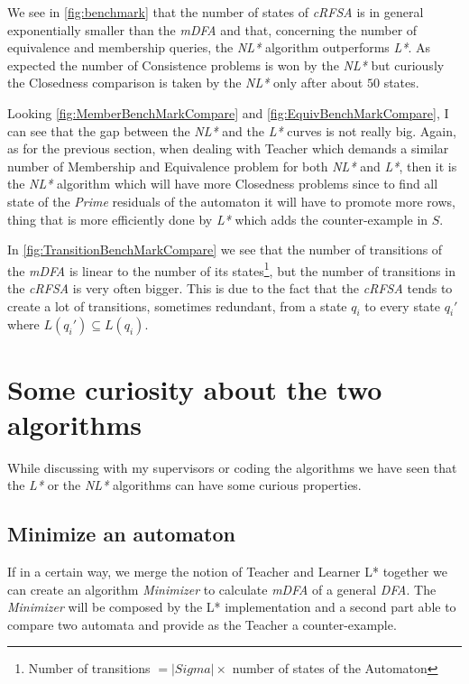 We see in \cref{fig:benchmark} that the number of states of \textit{cRFSA} is in general exponentially smaller than the \textit{mDFA} and that, concerning the number of equivalence and membership queries, the \textit{NL*} algorithm outperforms \textit{L*}. As expected the number of Consistence problems is won by the \textit{NL*} but curiously the Closedness comparison is taken by the \textit{NL*} only after about $50$ states.

Looking \cref{fig:MemberBenchMarkCompare} and \cref{fig:EquivBenchMarkCompare}, I can see that the gap between the \textit{NL*} and the \textit{L*} curves is not really big. Again, as for the previous section, when dealing with Teacher which demands a similar number of Membership and Equivalence problem for both \textit{NL*} and \textit{L*}, then it is the \textit{NL*} algorithm which will have more Closedness problems since to find all state of the \textit{Prime} residuals of the automaton it will have to promote more rows, thing that is more efficiently done by \textit{L*} which adds the counter-example in $S$.

In \cref{fig:TransitionBenchMarkCompare} we see that the number of transitions of the \textit{mDFA} is linear to the number of its states\footnote{Number of transitions $= |Sigma| \times$ number of states of the Automaton}, but the number of transitions in the \textit{cRFSA} is very often bigger. This is due to the fact that the \textit{cRFSA} tends to create a lot of transitions, sometimes redundant, from a state $q_i$ to every state $q_i'$ where $L(q_i') \subseteq L(q_i)$.

\section{Some curiosity about the two algorithms}

While discussing with my supervisors or coding the algorithms we have seen that the \textit{L*} or the \textit{NL*} algorithms can have some curious properties.

\subsection{Minimize an automaton}

If in a certain way, we merge the notion of Teacher and Learner L* together we can create an algorithm \textit{Minimizer} to calculate \textit{mDFA} of a general \textit{DFA}. The \textit{Minimizer} will be composed by the L* implementation and a second part able to compare two automata and provide as the Teacher a counter-example.

